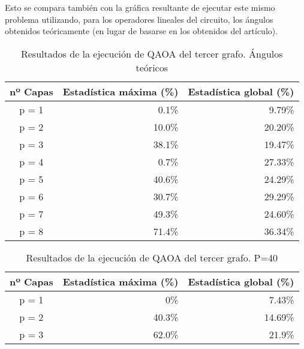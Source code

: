 \documentclass{article}
\begin{document}
Esto se compara también con la gráfica resultante de ejecutar este mismo problema utilizando, para los operadores lineales del circuito, los ángulos obtenidos teóricamente (en lugar de basarse en los obtenidos del artículo).

\begin{table}[htbp]
  \centering
  \begin{tabular}{|c|r|r|}
    \hline
    \textbf{nº Capas} & \textbf{Estadística máxima (\%)} & \textbf{Estadística global (\%)} \\ \hline
    p = 1 &  0.1\% &  9.79\% \\ \hline
    p = 2 & 10.0\% & 20.20\% \\ \hline
    p = 3 & 38.1\% & 19.47\% \\ \hline
    p = 4 &  0.7\% & 27.33\% \\ \hline  %
    p = 5 & 40.6\% & 24.29\% \\ \hline
    p = 6 & 30.7\% & 29.29\% \\ \hline
    p = 7 & 49.3\% & 24.60\% \\ \hline
    p = 8 & 71.4\% & 36.34\% \\ \hline
  \end{tabular}
  \caption{Resultados de la ejecución de QAOA del tercer grafo. Ángulos teóricos}
\end{table}

\begin{table}[htbp]
  \centering
  \begin{tabular}{|c|r|r|}
    \hline
    \textbf{nº Capas} & \textbf{Estadística máxima (\%)} & \textbf{Estadística global (\%)} \\ \hline
    p = 1 &    0\% &  7.43\% \\ \hline
    p = 2 & 40.3\% & 14.69\% \\ \hline
    p = 3 & 62.0\% &  21.9\% \\ \hline
  \end{tabular}
  \caption{Resultados de la ejecución de QAOA del tercer grafo. P=40}
\end{table}
\end{document}
